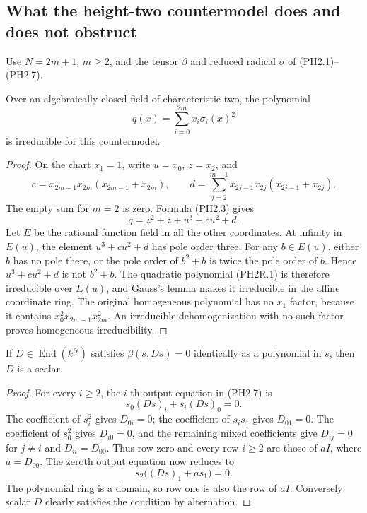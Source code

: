 \subsection*{What the height-two countermodel does and does not obstruct}

Use \(N=2m+1\), \(m\ge2\), and the tensor \(\beta\) and reduced
radical \(\sigma\) of (PH2.1)--(PH2.7).

\begin{lemma}
\label{lem:abstract-height-two-q-irreducible}
Over an algebraically closed field of characteristic two, the polynomial
\[
                    q(x)=\sum_{i=0}^{2m}x_i\sigma_i(x)^2
\]
is irreducible for this countermodel.
\end{lemma}
\begin{proof}
On the chart \(x_1=1\), write \(u=x_0\), \(z=x_2\), and
\[
 c=x_{2m-1}x_{2m}(x_{2m-1}+x_{2m}),\qquad
 d=\sum_{j=2}^{m-1}x_{2j-1}x_{2j}(x_{2j-1}+x_{2j}).
\]
The empty sum for \(m=2\) is zero.  Formula (PH2.3) gives
\[
                        q=z^2+z+u^3+cu^2+d.                    \tag{PH2R.1}
\]
Let \(E\) be the rational function field in all the other coordinates.
At infinity in \(E(u)\), the element \(u^3+cu^2+d\) has pole
order three.  For any \(b\in E(u)\), either \(b\) has no pole
there, or the pole order of \(b^2+b\) is twice the pole order of
\(b\).  Hence \(u^3+cu^2+d\) is not \(b^2+b\).
The quadratic polynomial (PH2R.1) is therefore irreducible over
\(E(u)\), and Gauss's lemma makes it irreducible in the affine
coordinate ring.  The original homogeneous polynomial has no
\(x_1\) factor, because it contains
\(x_0^2x_{2m-1}x_{2m}^2\).  An irreducible dehomogenization
with no such factor proves homogeneous irreducibility.
\end{proof}

\begin{lemma}
\label{lem:abstract-height-two-scalar-centroid}
If \(D\in\operatorname{End}(k^N)\) satisfies
\(\beta(s,Ds)=0\) identically as a polynomial in \(s\), then
\(D\) is a scalar.
\end{lemma}
\begin{proof}
For every \(i\ge2\), the \(i\)-th output equation in (PH2.7) is
\[
                       s_0(Ds)_i+s_i(Ds)_0=0.                 \tag{PH2R.2}
\]
The coefficient of \(s_i^2\) gives \(D_{0i}=0\); the coefficient
of \(s_is_1\) gives \(D_{01}=0\).  The coefficient of \(s_0^2\)
gives \(D_{i0}=0\), and the remaining mixed coefficients give
\(D_{ij}=0\) for \(j\ne i\) and \(D_{ii}=D_{00}\).
Thus row zero and every row \(i\ge2\) are those of \(aI\),
where \(a=D_{00}\).
The zeroth output equation now reduces to
\[
                         s_2\bigl((Ds)_1+a s_1\bigr)=0.
\]
The polynomial ring is a domain, so row one is also the row of
\(aI\).  Conversely scalar \(D\) clearly satisfies the condition
by alternation.
\end{proof}

